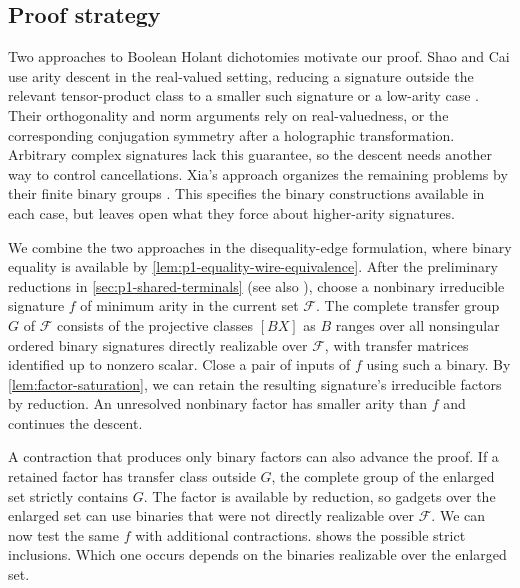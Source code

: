 \documentclass[11pt,letterpaper,onecolumn]{article}
\theoremstyle{plain}
\theoremstyle{definition}
\theoremstyle{remark}
\newcommand{\cF}{\mathcal F}
\begin{document}
\subsection{Proof strategy}
\label{subsec:intro-proof-strategy}

Two approaches to Boolean Holant dichotomies motivate our proof.
Shao and Cai use arity descent in the real-valued setting, reducing a
signature outside the relevant tensor-product class to a smaller such
signature or a low-arity case \cite[Sections~3--4]{ShaoCai2020}.
Their orthogonality and norm arguments rely on real-valuedness, or
the corresponding conjugation symmetry after a holographic
transformation.  Arbitrary complex signatures lack this guarantee,
so the descent needs another way to control cancellations.
Xia's approach organizes the remaining problems by their finite
binary groups \cite[Sections~4--5]{Xia2026FrameworkV1}.
This specifies the binary constructions available in each case, but
leaves open what they force about higher-arity signatures.

We combine the two approaches in the disequality-edge formulation, where
binary equality is available by \cref{lem:p1-equality-wire-equivalence}.
After the preliminary reductions in \cref{sec:p1-shared-terminals}
(see also \cite{CaiFuXia2018SixVertex,CaiFuShao2020ARS}), choose a nonbinary
irreducible signature \(f\) of minimum arity in the current set \(\cF\).
The complete transfer group \(G\) of \(\cF\) consists of the projective
classes \([BX]\) as \(B\) ranges over all nonsingular ordered binary
signatures directly realizable over \(\cF\), with transfer matrices identified
up to nonzero scalar. Close a pair of inputs
of \(f\) using such a binary. By \cref{lem:factor-saturation}, we can retain the resulting signature's
irreducible factors by reduction. An unresolved nonbinary factor has smaller
arity than \(f\) and continues the descent.

A contraction that produces only binary factors can also advance the proof.
If a retained factor has transfer class outside \(G\), the complete group
of the enlarged set strictly contains \(G\). The factor is available by
reduction, so gadgets over the enlarged set can use binaries that were not
directly realizable over \(\cF\). We can now test the same \(f\) with
additional contractions.  shows the
possible strict inclusions. Which one occurs depends on the binaries
realizable over the enlarged set.
\end{document}
